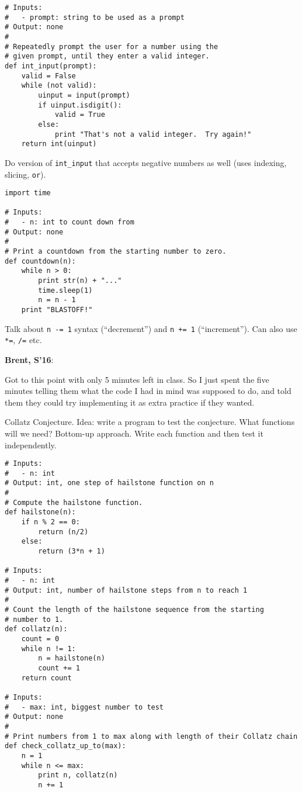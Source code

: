 \documentclass{article}
\newenvironment{reflect}[1]
{
  \noindent
  \begin{lrbox}{\reflectbox}
    \begin{minipage}[t]{\textwidth}
      \textbf{#1}:
}{
    \end{minipage}
  \end{lrbox}
  \fbox{\usebox{\reflectbox}}
}
\begin{document}
\begin{verbatim}
# Inputs:
#   - prompt: string to be used as a prompt
# Output: none
#
# Repeatedly prompt the user for a number using the
# given prompt, until they enter a valid integer.
def int_input(prompt):
    valid = False
    while (not valid):
        uinput = input(prompt)
        if uinput.isdigit():
            valid = True
        else:
            print "That's not a valid integer.  Try again!"
    return int(uinput)
\end{verbatim}

Do version of \verb|int_input| that accepts negative numbers as well
(uses indexing, slicing, \verb|or|).

\begin{verbatim}
import time

# Inputs:
#   - n: int to count down from
# Output: none
#
# Print a countdown from the starting number to zero.
def countdown(n):
    while n > 0:
        print str(n) + "..."
        time.sleep(1)
        n = n - 1
    print "BLASTOFF!"
\end{verbatim}

Talk about \verb|n -= 1| syntax (``decrement'') and \verb|n += 1|
(``increment'').  Can also use \verb|*=|, \verb|/=| etc.

\begin{reflect}{Brent, S'16}
  Got to this point with only 5 minutes left in class.  So I just
  spent the five minutes telling them what the code I had in mind was
  supposed to do, and told them they could try implementing it as
  extra practice if they wanted.
\end{reflect}

Collatz Conjecture.  Idea: write a program to test the conjecture.
What functions will we need?  Bottom-up approach.  Write each function
and then test it independently.
\begin{verbatim}
# Inputs:
#   - n: int
# Output: int, one step of hailstone function on n
#
# Compute the hailstone function.
def hailstone(n):
    if n % 2 == 0:
        return (n/2)
    else:
        return (3*n + 1)

# Inputs:
#   - n: int
# Output: int, number of hailstone steps from n to reach 1
#
# Count the length of the hailstone sequence from the starting
# number to 1.
def collatz(n):
    count = 0
    while n != 1:
        n = hailstone(n)
        count += 1
    return count

# Inputs:
#   - max: int, biggest number to test
# Output: none
#
# Print numbers from 1 to max along with length of their Collatz chain
def check_collatz_up_to(max):
    n = 1
    while n <= max:
        print n, collatz(n)
        n += 1
\end{verbatim}
\end{document}
